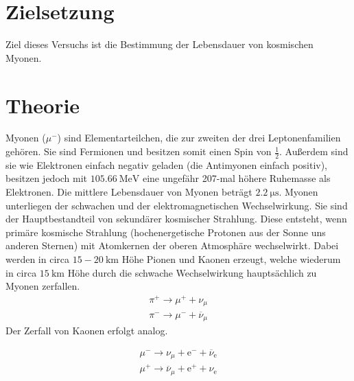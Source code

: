 \section{Zielsetzung}
\label{sec:Zielsetzung}
Ziel dieses Versuchs ist die Bestimmung der Lebensdauer von kosmischen Myonen.


\section{Theorie}
\label{sec:Theorie}

Myonen ($\mu^-$) sind Elementarteilchen, die zur zweiten der drei Leptonenfamilien gehören.
Sie sind Fermionen und besitzen somit einen Spin von $\frac{1}{2}$.
Außerdem sind sie wie Elektronen einfach negativ geladen (die Antimyonen einfach positiv), besitzen jedoch mit $\qty{105.66}{\mega\electronvolt}$
eine ungefähr 207-mal höhere Ruhemasse als Elektronen.
Die mittlere Lebensdauer von Myonen beträgt $\qty{2.2}{\micro\second}$. \cite{PDG}
Myonen unterliegen der schwachen und der elektromagnetischen Wechselwirkung.
Sie sind der Hauptbestandteil von sekundärer kosmischer Strahlung.
Diese entsteht, wenn primäre kosmische Strahlung (hochenergetische Protonen aus der Sonne uns anderen Sternen) mit Atomkernen
der oberen Atmosphäre wechselwirkt. Dabei werden in circa $15-\qty{20}{\kilo\meter}$ Höhe Pionen und Kaonen erzeugt,
welche wiederum in circa $\qty{15}{\kilo\meter}$ Höhe durch die schwache Wechselwirkung hauptsächlich zu Myonen zerfallen.
\begin{align*}
    \pi^+ \longrightarrow \mu^+ + \nu_{\mu} \\
    \pi^- \longrightarrow \mu^- + \overline{\nu}_{\mu}
\end{align*}
Der Zerfall von Kaonen erfolgt analog.

 

\begin{align*}
    \mu^- \longrightarrow \nu_{\mu} + \text{e}^- + \overline{\nu}_{\text{e}} \\
    \mu^+ \longrightarrow \overline{\nu}_{\mu} + \text{e}^+ + \nu_{\text{e}} 
\end{align*}


